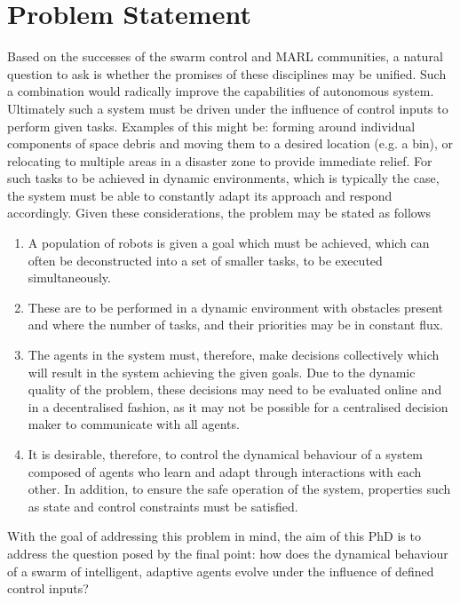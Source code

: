 \documentclass[.../main.tex]{subfiles}
\begin{document}
    \section{Problem Statement} \label{sec::Problem_Statement}

    Based on the successes of the swarm control and MARL communities,
    a natural question to ask is whether the promises of these
    disciplines may be unified. Such a combination would radically
    improve the capabilities of autonomous system. Ultimately such a
    system must be driven under the influence of control inputs to
    perform given tasks. Examples of this might be: forming around
    individual components of space debris and moving them to a desired
    location (e.g. a bin), or relocating to multiple areas in a
    disaster zone to provide immediate relief. For such tasks to be
    achieved in dynamic environments, which is typically the case, the
    system must be able to constantly adapt its approach and respond
    accordingly. Given these considerations, the problem may be stated
    as follows

    \begin{enumerate}
    	\item A population of robots is given a goal which must be achieved, which can often be
    	deconstructed into a set of smaller tasks, to be executed simultaneously. 
    	\item These are to be performed in a dynamic environment with obstacles present and where
    	the number of tasks, and their priorities may be in constant flux.
    	\item The agents in the system must, therefore, make decisions collectively which will result
        in the system achieving the given goals. Due to the dynamic quality of the problem, these
        decisions may need to be evaluated online and in a decentralised fashion, as it may not be
        possible for a centralised decision maker to communicate with all agents. 
        \item It is desirable, therefore, to control the dynamical behaviour of
    	a system composed of agents who learn and adapt through interactions with each other. In
    	addition, to ensure the safe operation of the system, properties such as state and control
    	constraints must be satisfied.
    \end{enumerate}


    With the goal of addressing this problem in mind, the aim of this PhD is to address the question
    posed by the final point: how does the dynamical behaviour of a swarm of intelligent, adaptive
    agents evolve under the influence of defined control inputs?
\end{document}
